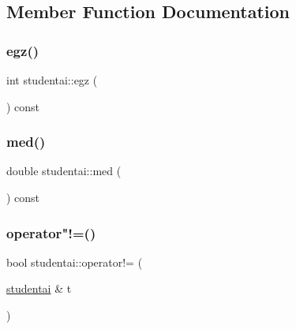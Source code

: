 \subsection{Member Function Documentation}
\mbox{\label{classstudentai_a5bcdc07aacdebaf33b4bfbd6329011b2}} 
\subsubsection{\texorpdfstring{egz()}{egz()}}
{\footnotesize\ttfamily int studentai\+::egz (\begin{DoxyParamCaption}{ }\end{DoxyParamCaption}) const\hspace{0.3cm}{\ttfamily [inline]}}

\mbox{\label{classstudentai_ae448b8ec1c5d99c6f6313f7e4a12ed14}} 
\subsubsection{\texorpdfstring{med()}{med()}}
{\footnotesize\ttfamily double studentai\+::med (\begin{DoxyParamCaption}{ }\end{DoxyParamCaption}) const\hspace{0.3cm}{\ttfamily [inline]}}

\mbox{\label{classstudentai_a7a3b7897b606939df81d11830d366991}} 
\subsubsection{\texorpdfstring{operator"!=()}{operator!=()}}
{\footnotesize\ttfamily bool studentai\+::operator!= (\begin{DoxyParamCaption}\item[{\mbox{\hyperlink{classstudentai}{studentai}} \&}]{t }\end{DoxyParamCaption})\hspace{0.3cm}{\ttfamily [inline]}}

\mbox{\label{classstudentai_adfd1e116c63411da1819da800355dd4d}} 

